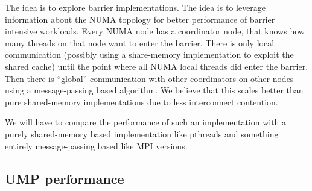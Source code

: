 \documentclass{article}
\begin{document}
The idea is to explore barrier implementations. The idea is to
leverage information about the NUMA topology for better performance of
barrier intensive workloads. Every NUMA node has a coordinator node,
that knows how many threads on that node want to enter the
barrier. There is only local communication (possibly using a
share-memory implementation to exploit the shared cache) until the
point where all NUMA local threads did enter the barrier.  Then there
is ``global'' communication with other coordinators on other nodes
using a message-passing based algorithm. We believe that this scales
better than pure shared-memory implementations due to less
interconnect contention.

We will have to compare the performance of such an implementation with
a purely shared-memory based implementation like pthreads and
something entirely message-passing based like MPI versions.

\newpage



\label{LastPage}


\begin{appendices}

\section{UMP performance}



\newpage






\end{appendices}
\end{document}
